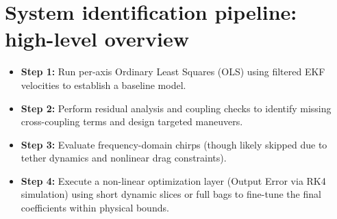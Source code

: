 \chapter*{System identification pipeline: high-level overview}
\label{ch:overview}

\begin{itemize}
  \item \textbf{Step 1:} Run per-axis Ordinary Least Squares (OLS) using filtered EKF velocities to
        establish a baseline model.
  \item \textbf{Step 2:} Perform residual analysis and coupling checks to identify missing
        cross-coupling terms and design targeted maneuvers.
  \item \textbf{Step 3:} Evaluate frequency-domain chirps (though likely skipped due to tether
        dynamics and nonlinear drag constraints).
  \item \textbf{Step 4:} Execute a non-linear optimization layer (Output Error via RK4
        simulation) using short dynamic slices or full bags to fine-tune the final coefficients
        within physical bounds.
\end{itemize}
